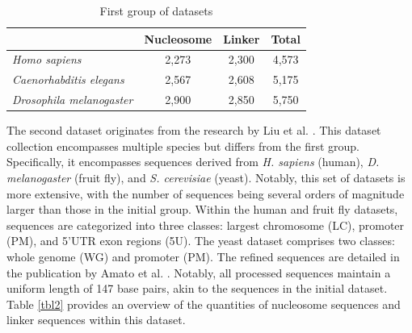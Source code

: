 \documentclass[a4paper,fleqn]{cas-dc}
\begin{document}
\begin{table}[width=\linewidth,cols=4,pos=h]
	\caption{First group of datasets}
	\label{tbl1}
	\begin{tabular*}{\tblwidth}{@{} LCCC @{} }
		\toprule
		& Nucleosome & Linker & Total \\
		\midrule
		\textit{Homo sapiens} & 2,273 & 2,300 & 4,573 \\
		\textit{Caenorhabditis elegans} & 2,567 & 2,608 & 5,175 \\
		\textit{Drosophila melanogaster} & 2,900 & 2,850 & 5,750 \\

		\bottomrule
	\end{tabular*}
\end{table}

The second dataset originates from the research by Liu et al. \cite{Liu2013}. This dataset collection encompasses multiple species but differs from the first group. Specifically, it encompasses sequences derived from \textit{H. sapiens} (human), \textit{D. melanogaster} (fruit fly), and \textit{S. cerevisiae} (yeast). Notably, this set of datasets is more extensive, with the number of sequences being several orders of magnitude larger than those in the initial group. Within the human and fruit fly datasets, sequences are categorized into three classes: largest chromosome (LC), promoter (PM), and 5'UTR exon regions (5U). The yeast dataset comprises two classes: whole genome (WG) and promoter (PM). The refined sequences are detailed in the publication by Amato et al. \cite{Amato2020}. Notably, all processed sequences maintain a uniform length of 147 base pairs, akin to the sequences in the initial dataset. Table \ref{tbl2} provides an overview of the quantities of nucleosome sequences and linker sequences within this dataset.
\end{document}
